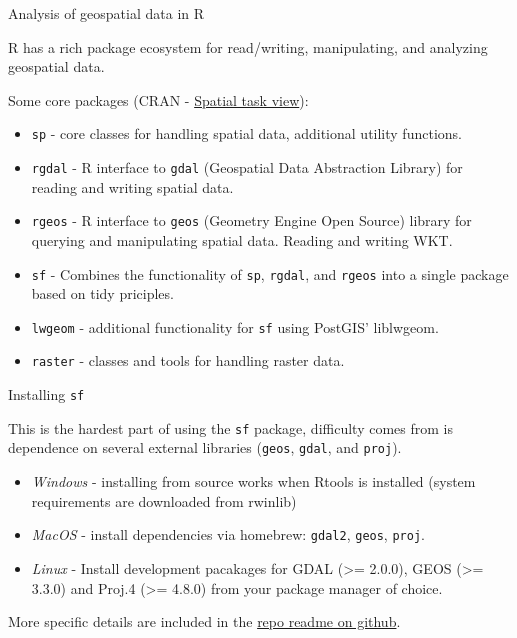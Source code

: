 \documentclass[11pt,ignorenonframetext,]{beamer}
\begin{document}
\begin{frame}[fragile,t]{Analysis of geospatial data in R}
\protect\hypertarget{analysis-of-geospatial-data-in-r}{}

R has a rich package ecosystem for read/writing, manipulating, and
analyzing geospatial data.

\vspace{2mm}

Some core packages (CRAN -
\href{http://cran.r-project.org/web/views/Spatial.html}{Spatial task
view}):

\begin{itemize}
\item
  \texttt{sp} - core classes for handling spatial data, additional
  utility functions.
\item
  \texttt{rgdal} - R interface to \texttt{gdal} (Geospatial Data
  Abstraction Library) for reading and writing spatial data.
\item
  \texttt{rgeos} - R interface to \texttt{geos} (Geometry Engine Open
  Source) library for querying and manipulating spatial data. Reading
  and writing WKT.
\item
  \texttt{sf} - Combines the functionality of \texttt{sp},
  \texttt{rgdal}, and \texttt{rgeos} into a single package based on tidy
  priciples.
\item
  \texttt{lwgeom} - additional functionality for \texttt{sf} using
  PostGIS’ liblwgeom.
\item
  \texttt{raster} - classes and tools for handling raster data.
\end{itemize}

\end{frame}

\begin{frame}[fragile,t]{Installing \texttt{sf}}
\protect\hypertarget{installing-sf}{}

This is the hardest part of using the \texttt{sf} package, difficulty
comes from is dependence on several external libraries (\texttt{geos},
\texttt{gdal}, and \texttt{proj}).

\begin{itemize}
\item
  \emph{Windows} - installing from source works when Rtools is installed
  (system requirements are downloaded from rwinlib)
\item
  \emph{MacOS} - install dependencies via homebrew: \texttt{gdal2},
  \texttt{geos}, \texttt{proj}.
\item
  \emph{Linux} - Install development pacakages for GDAL (\textgreater{}=
  2.0.0), GEOS (\textgreater{}= 3.3.0) and Proj.4 (\textgreater{}=
  4.8.0) from your package manager of choice.
\end{itemize}

More specific details are included in the
\href{https://github.com/r-spatial/sf}{repo readme on github}.

\end{frame}
\end{document}
